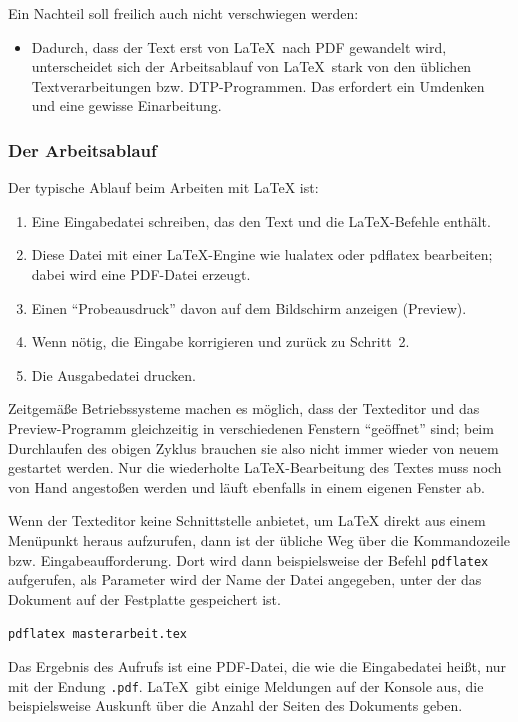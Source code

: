 Ein Nachteil soll freilich auch nicht verschwiegen werden:
\begin{itemize}
\item Dadurch, dass der Text erst von \LaTeX\ nach PDF gewandelt wird, unterscheidet sich der Arbeitsablauf von \LaTeX\ stark von den üblichen Textverarbeitungen bzw. DTP-Programmen. Das erfordert ein Umdenken und eine gewisse Einarbeitung.
\end{itemize}

\subsubsection{Der Arbeitsablauf}
Der typische Ablauf beim Arbeiten mit \LaTeX{} ist:
\begin{enumerate}
  \item Eine Eingabedatei schreiben, das den Text und die \LaTeX-Befehle 
  enthält.
  \item Diese Datei mit einer \LaTeX-Engine wie lualatex oder pdflatex bearbeiten; dabei wird eine PDF-Datei erzeugt.
  \item Einen \enquote{Probeausdruck} davon auf dem Bildschirm anzeigen (Preview).
  \item Wenn nötig, die Eingabe korrigieren und zurück zu Schritt~2.
  \item Die Ausgabedatei drucken.
\end{enumerate}
Zeitgemäße Betriebssysteme machen es möglich, dass der Texteditor
und das Preview-Programm gleichzeitig in verschiedenen Fenstern 
\enquote{geöffnet} sind; beim Durchlaufen des obigen Zyklus brauchen sie 
also nicht immer wieder von neuem gestartet werden.  Nur die 
wiederholte \LaTeX-Bearbeitung des Textes muss noch von Hand 
angestoßen werden und läuft ebenfalls in einem eigenen Fenster ab.

Wenn der Texteditor keine Schnittstelle anbietet, um \LaTeX{} direkt aus einem Menüpunkt heraus aufzurufen, dann ist der übliche Weg über die Kommandozeile bzw. Eingabeaufforderung. Dort wird dann beispielsweise der Befehl \texttt{pdflatex} aufgerufen, als Parameter wird der Name der Datei angegeben, unter der das Dokument auf der Festplatte gespeichert ist.

\begin{beispiel}
  \texttt{pdflatex masterarbeit.tex}
\end{beispiel}
Das Ergebnis des Aufrufs ist eine PDF-Datei, die wie die Eingabedatei heißt, nur mit der Endung \texttt{.pdf}. \LaTeX\ gibt einige Meldungen auf der Konsole aus, die beispielsweise Auskunft über die Anzahl der Seiten des Dokuments geben.

